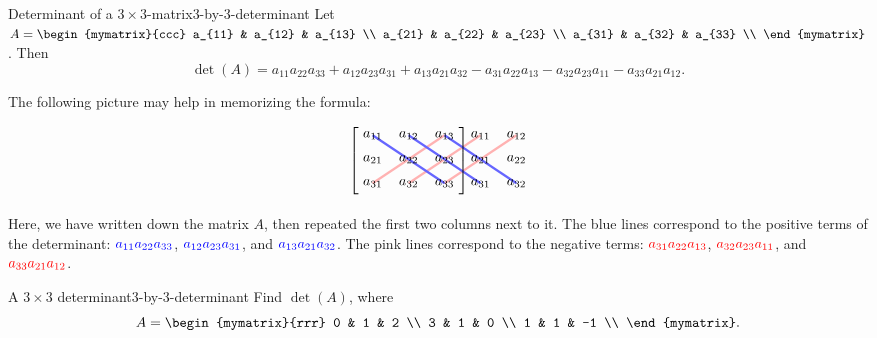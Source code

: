 \begin{definition}{Determinant of a $3\times 3$-matrix}{3-by-3-determinant}
  Let $A=\begin{mymatrix}{ccc}
    a_{11} & a_{12} & a_{13} \\
    a_{21} & a_{22} & a_{23} \\
    a_{31} & a_{32} & a_{33} \\
  \end{mymatrix}$. Then
  \begin{equation*}
    \det(A)
    = a_{11}a_{22}a_{33}
    + a_{12}a_{23}a_{31}
    + a_{13}a_{21}a_{32}
    - a_{31}a_{22}a_{13}
    - a_{32}a_{23}a_{11}
    - a_{33}a_{21}a_{12}.
  \end{equation*}
\end{definition}

The following picture may help in memorizing the formula:
\begin{equation*}
  \begin{tikzpicture}[yscale=0.6,xscale=0.9]
    \draw[ultra thick,red!30] (1,-3) -- (3,-1);
    \draw[ultra thick,red!30] (2,-3) -- (4,-1);
    \draw[ultra thick,red!30] (3,-3) -- (5,-1);
    \draw[ultra thick,blue!60] (1,-1) -- (3,-3);
    \draw[ultra thick,blue!60] (2,-1) -- (4,-3);
    \draw[ultra thick,blue!60] (3,-1) -- (5,-3);
    \foreach\i in {1,2,3} {
      \foreach\j in {1,2,3} {
        \path (\j,-\i) node {$a_{\i\j}$};
      }
    }
    \foreach\i in {1,2,3} {
      \foreach\j in {1,2} {
        \path (\j,-\i) + (3,0) node {$a_{\i\j}$};
      }
    }
    \draw(0.5,-2) node {$\left[\rule{0mm}{1.0cm}\right.$};
    \draw(3.5,-2) node {$\left.\rule{0mm}{1.0cm}\right]$};
  \end{tikzpicture}
\end{equation*}
Here, we have written down the matrix $A$, then repeated the first two
columns next to it. The blue lines correspond to the positive terms of
the determinant: $\color{blue}a_{11}a_{22}a_{33}$,
$\color{blue}a_{12}a_{23}a_{31}$, and
$\color{blue}a_{13}a_{21}a_{32}$. The pink lines correspond to the
negative terms: $\color{red}a_{31}a_{22}a_{13}$,
$\color{red}a_{32}a_{23}a_{11}$, and $\color{red}a_{33}a_{21}a_{12}$.

\begin{example}{A $3\times 3$ determinant}{3-by-3-determinant}
  Find $\det(A)$, where
  \begin{equation*}
    A = \begin{mymatrix}{rrr}
      0 & 1 & 2 \\
      3 & 1 & 0 \\
      1 & 1 & -1 \\
    \end{mymatrix}.
  \end{equation*}
\end{example}

